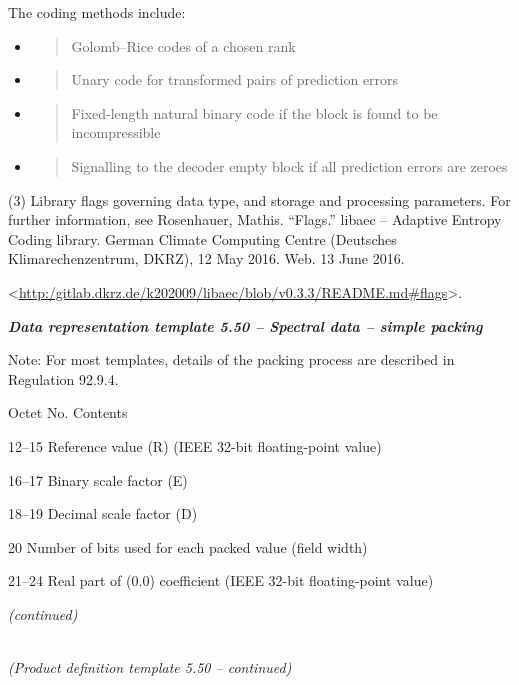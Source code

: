 The coding methods include:

\begin{itemize}
\item
  \begin{quote}
  Golomb--Rice codes of a chosen rank
  \end{quote}
\item
  \begin{quote}
  Unary code for transformed pairs of prediction errors
  \end{quote}
\item
  \begin{quote}
  Fixed-length natural binary code if the block is found to be incompressible
  \end{quote}
\item
  \begin{quote}
  Signalling to the decoder empty block if all prediction errors are zeroes
  \end{quote}
\end{itemize}

(3) Library flags governing data type, and storage and processing parameters. For further information, see Rosenhauer, Mathis. ``Flags.'' libaec -- Adaptive Entropy Coding library. German Climate Computing Centre (Deutsches Klimarechenzentrum, DKRZ), 12 May 2016. Web. 13 June 2016.

\textless{}\href{http://gitlab.dkrz.de/k202009/libaec/blob/v0.3.3/README.md\#flags}{http:/gitlab.dkrz.de/k202009/libaec/blob/v0.3.3/README.md\#flags}\textgreater.

\emph{\textbf{Data representation template 5.50 -- Spectral data -- simple packing}}

Note: For most templates, details of the packing process are described in Regulation 92.9.4.

Octet No. Contents

12--15 Reference value (R) (IEEE 32-bit floating-point value)

16--17 Binary scale factor (E)

18--19 Decimal scale factor (D)

20 Number of bits used for each packed value (field width)

21--24 Real part of (0.0) coefficient (IEEE 32-bit floating-point value)

\emph{(continued)}

\emph{\\
(Product definition template 5.50 -- continued)}


